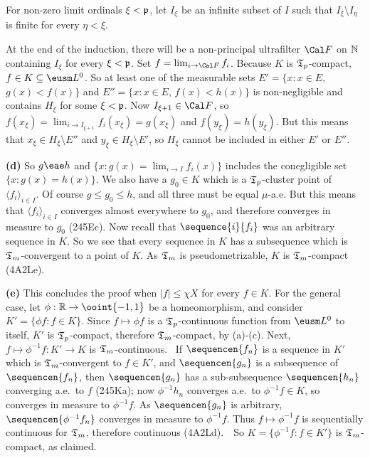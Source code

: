 {For non-zero limit ordinals $\xi<\frak p$, let $I_{\xi}$ be an infinite
subset of $I$ such that $I_{\xi}\setminus I_{\eta}$ is finite for every
$\eta<\xi$.

At the end of the induction, there will be a non-principal ultrafilter
$\Cal F$ on $\Bbb N$ containing $I_{\xi}$ for every $\xi<\frak p$.
Set $f=\lim_{i\to\Cal F}f_i$.   Because $K$ is $\frak T_p$-compact,
$f\in K\subseteq\eusm L^0$.   So at least one of the measurable sets
$E'=\{x:x\in E$, $g(x)<f(x)\}$ and $E''=\{x:x\in E$, $f(x)<h(x)\}$ is
non-negligible and contains $H_{\xi}$ for some $\xi<\frak p$.   Now
$I_{\xi+1}\in\Cal F$, so
$f(x_{\xi})=\lim_{i\to I_{\xi+1}}f_i(x_{\xi})=g(x_{\xi})$ and
$f(y_{\xi})=h(y_{\xi})$.   But this means that
$x_{\xi}\in H_{\xi}\setminus E''$ and $y_{\xi}\in H_{\xi}\setminus E'$, so
$H_{\xi}$ cannot be included in either $E'$ or $E''$.\ \Bang

\medskip

{\bf (d)} So $g\eae h$ and $\{x:g(x)=\lim_{i\to I}f_i(x)\}$ includes the
conegligible set $\{x:g(x)=h(x)\}$.
We also have a $g_0\in K$ which is a $\frak T_p$-cluster point of
$\langle f_i\rangle_{i\in I}$.   Of course $g\le g_0\le h$, and
all three must be equal $\mu$-a.e.
But this means that $\langle f_i\rangle_{i\in I}$ converges
almost everywhere to $g_0$, and
therefore converges in measure to $g_0$ (245Ec).
Now recall that
$\sequence{i}{f_i}$ was an arbitrary sequence in $K$.   So we see that
every sequence in $K$ has a subsequence which is $\frak T_m$-convergent to
a point of $K$.   As $\frak T_m$ is pseudometrizable, $K$ is
$\frak T_m$-compact (4A2Le).

\medskip

{\bf (e)} This concludes the proof when $|f|\le\chi X$ for every $f\in K$.
For the general case, let $\phi:\Bbb R\to\ooint{-1,1}$ be a homeomorphism,
and consider $K'=\{\phi f:f\in K\}$.   Since
$f\mapsto\phi f$ is a $\frak T_p$-continuous function from $\eusm L^0$
to itself, $K'$ is $\frak T_p$-compact,
therefore $\frak T_m$-compact, by (a)-(c).
Next, $f\mapsto\phi^{-1}f:K'\to K$
is $\frak T_m$-continuous.  \Prf\ If $\sequencen{f_n}$ is a sequence in
$K'$ which is $\frak T_m$-convergent to $f\in K'$, and
$\sequencen{g_n}$ is a subsequence of $\sequencen{f_n}$, then
$\sequencen{g_n}$ has a sub-subsequence $\sequencen{h_n}$ converging a.e.\
to $f$ (245Ka);
now $\phi^{-1}h_n$ converges a.e.\ to $\phi^{-1}f\in K$, so
converges in measure to $\phi^{-1}f$.   As $\sequencen{g_n}$ is arbitrary,
$\sequencen{\phi^{-1}f_n}$ converges in measure to $\phi^{-1}f$.
Thus $f\mapsto\phi^{-1}f$ is sequentially continuous for $\frak T_m$,
therefore continuous (4A2Ld).\ \QeD\  So $K=\{\phi^{-1}f:f\in K'\}$ is
$\frak T_m$-compact, as claimed.
}%

